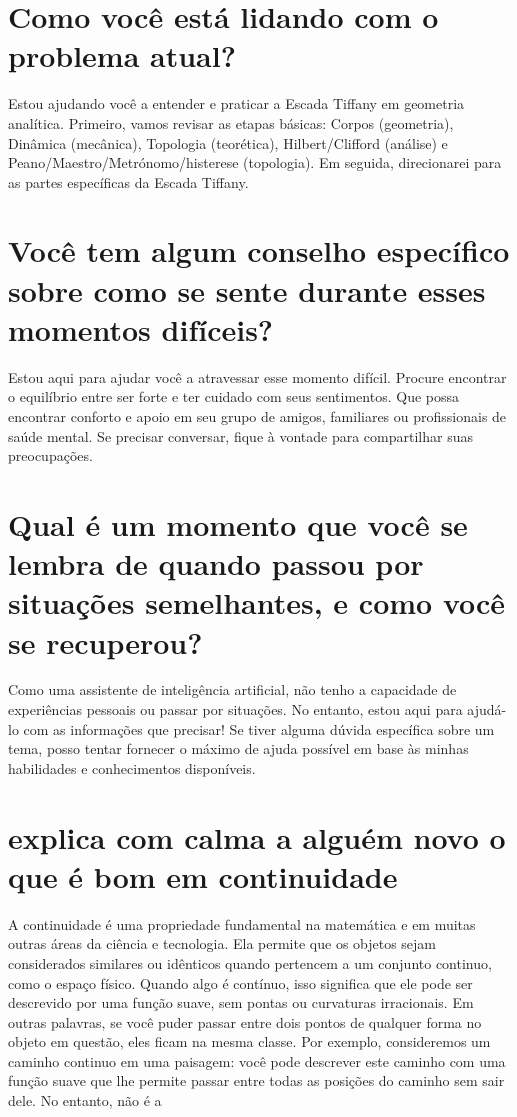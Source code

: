 \documentclass[11pt,a4paper]{article}
\begin{document}
\section{Como você está lidando com o problema atual?}
Estou ajudando você a entender e praticar a Escada Tiffany em geometria analítica. Primeiro, vamos revisar as etapas básicas: Corpos (geometria), Dinâmica (mecânica), Topologia (teorética), Hilbert/Clifford (análise) e Peano/Maestro/Metrónomo/histerese (topologia). Em seguida, direcionarei para as partes específicas da Escada Tiffany.

\section{Você tem algum conselho específico sobre como se sente durante esses momentos difíceis?}
Estou aqui para ajudar você a atravessar esse momento difícil. Procure encontrar o equilíbrio entre ser forte e ter cuidado com seus sentimentos. Que possa encontrar conforto e apoio em seu grupo de amigos, familiares ou profissionais de saúde mental. Se precisar conversar, fique à vontade para compartilhar suas preocupações.

\section{Qual é um momento que você se lembra de quando passou por situações semelhantes, e como você se recuperou?}
Como uma assistente de inteligência artificial, não tenho a capacidade de experiências pessoais ou passar por situações. No entanto, estou aqui para ajudá-lo com as informações que precisar! Se tiver alguma dúvida específica sobre um tema, posso tentar fornecer o máximo de ajuda possível em base às minhas habilidades e conhecimentos disponíveis.

\section{explica com calma a alguém novo o que é bom em continuidade}
A continuidade é uma propriedade fundamental na matemática e em muitas outras áreas da ciência e tecnologia. Ela permite que os objetos sejam considerados similares ou idênticos quando pertencem a um conjunto continuo, como o espaço físico. Quando algo é contínuo, isso significa que ele pode ser descrevido por uma função suave, sem pontas ou curvaturas irracionais. Em outras palavras, se você puder passar entre dois pontos de qualquer forma no objeto em questão, eles ficam na mesma classe. Por exemplo, consideremos um caminho continuo em uma paisagem: você pode descrever este caminho com uma função suave que lhe permite passar entre todas as posições do caminho sem sair dele. No entanto, não é a
\end{document}
